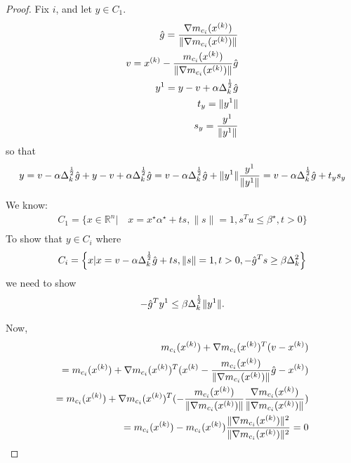 \begin{proof}

Fix $i$, and let $y \in C_1$.
\begin{align*}
\hat g = \frac {\nabla m_{c_i}({x^{(k)}})}{\|\nabla m_{c_i}({x^{(k)}})\|} \\
v = {x^{(k)}} - \frac {m_{c_i}({x^{(k)}})}{\|\nabla m_{c_i}({x^{(k)}})\|} \hat g \\
y^1 = y - v + \alpha \Delta_k^{\frac 1 2} \hat g \\
t_y = \|y^1\| \\
s_y = \frac{y^1}{\|y^1\|}
\end{align*}
so that
\begin{align*}
y = v - \alpha \Delta_k^{\frac 1 2} \hat g + y - v + \alpha \Delta_k^{\frac 1 2} \hat g = v - \alpha \Delta_k^{\frac 1 2} \hat g + \|y^1\|\frac{y^1}{\|y^1\|} = v - \alpha \Delta_k^{\frac 1 2} \hat g + t_ys_y 
\end{align*}

We know:
\begin{align*}
C_1 = \{x \in \mathbb R^n | \quad x = x^{\star} \alpha^{\star} + ts, \|s\| = 1, s^Tu \le \beta^{\star}, t > 0 \} \\
\end{align*}
To show that $y \in C_i$ where
\begin{align*}
C_i = \left\{x | x = v - \alpha\Delta_k^{\frac 1 2}\hat g + ts, \|s\| = 1, t>0, -\hat g^Ts\ge\beta\Delta_k^{2} \right\} \\
\end{align*}
we need to show
\begin{align}
-\hat g ^T y^1 \le \beta \Delta_k^{\frac 1 2}\|y^1\|.
\end{align}





















Now,
\begin{align*}
m_{c_i}({x^{(k)}}) + \nabla m_{c_i}({x^{(k)}})^T (v - {x^{(k)}}) \\
=m_{c_i}({x^{(k)}}) + \nabla m_{c_i}({x^{(k)}})^T ({x^{(k)}} - \frac {m_{c_i}({x^{(k)}})}{\|\nabla m_{c_i}({x^{(k)}})\|} \hat g - {x^{(k)}}) \\
=m_{c_i}({x^{(k)}}) + \nabla m_{c_i}({x^{(k)}})^T (- \frac {m_{c_i}({x^{(k)}})}{\|\nabla m_{c_i}({x^{(k)}})\|} \frac {\nabla m_{c_i}({x^{(k)}})}{\|\nabla m_{c_i}({x^{(k)}})\|}) \\
=m_{c_i}({x^{(k)}}) - m_{c_i}({x^{(k)}}) \frac {\|\nabla m_{c_i}({x^{(k)}})\|^2}{\|\nabla m_{c_i}({x^{(k)}})\|^2} = 0 \\
\end{align*}


\end{proof}
